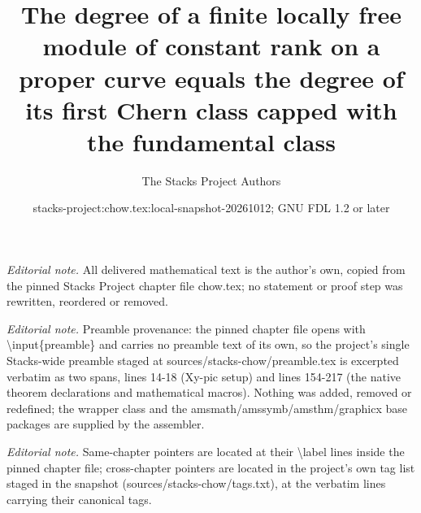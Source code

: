 \documentclass[10pt,a4paper]{amsart}
\title{The degree of a finite locally free module of constant rank on a proper curve equals the degree of its first Chern class capped with the fundamental class}
\author{The Stacks Project Authors}
\date{stacks-project:chow.tex:local-snapshot-20261012; GNU FDL 1.2 or later}
\theoremstyle{plain}
\theoremstyle{definition}
\theoremstyle{remark}
\numberwithin{equation}{subsection}
\begin{document}
\maketitle
\noindent\textit{Editorial note.} All delivered mathematical text is the author's own, copied from the pinned Stacks Project chapter file chow.tex; no statement or proof step was rewritten, reordered or removed.\par\medskip
\noindent\textit{Editorial note.} Preamble provenance: the pinned chapter file opens with \textbackslash{}input\{preamble\} and carries no preamble text of its own, so the project's single Stacks-wide preamble staged at sources/stacks-chow/preamble.tex is excerpted verbatim as two spans, lines 14-18 (Xy-pic setup) and lines 154-217 (the native theorem declarations and mathematical macros). Nothing was added, removed or redefined; the wrapper class and the amsmath/amssymb/amsthm/graphicx base packages are supplied by the assembler.\par\medskip
\noindent\textit{Editorial note.} Same-chapter pointers are located at their \textbackslash{}label lines inside the pinned chapter file; cross-chapter pointers are located in the project's own tag list staged in the snapshot (sources/stacks-chow/tags.txt), at the verbatim lines carrying their canonical tags.\par\medskip
\end{document}
